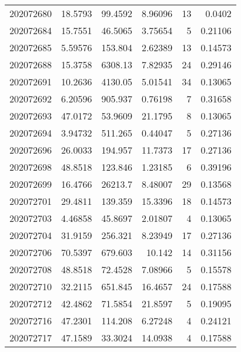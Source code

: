 \begin{tabular}{rrrrrr}
 202072680 &         18.5793  &       99.4592 &            8.96096 &          13 & 0.0402  \\
 202072684 &         15.7551  &       46.5065 &            3.75654 &           5 & 0.21106 \\
 202072685 &          5.59576 &      153.804  &            2.62389 &          13 & 0.14573 \\
 202072688 &         15.3758  &     6308.13   &            7.82935 &          24 & 0.29146 \\
 202072691 &         10.2636  &     4130.05   &            5.01541 &          34 & 0.13065 \\
 202072692 &          6.20596 &      905.937  &            0.76198 &           7 & 0.31658 \\
 202072693 &         47.0172  &       53.9609 &           21.1795  &           8 & 0.13065 \\
 202072694 &          3.94732 &      511.265  &            0.44047 &           5 & 0.27136 \\
 202072696 &         26.0033  &      194.957  &           11.7373  &          17 & 0.27136 \\
 202072698 &         48.8518  &      123.846  &            1.23185 &           6 & 0.39196 \\
 202072699 &         16.4766  &    26213.7    &            8.48007 &          29 & 0.13568 \\
 202072701 &         29.4811  &      139.359  &           15.3396  &          18 & 0.14573 \\
 202072703 &          4.46858 &       45.8697 &            2.01807 &           4 & 0.13065 \\
 202072704 &         31.9159  &      256.321  &            8.23949 &          17 & 0.27136 \\
 202072706 &         70.5397  &      679.603  &           10.142   &          14 & 0.31156 \\
 202072708 &         48.8518  &       72.4528 &            7.08966 &           5 & 0.15578 \\
 202072710 &         32.2115  &      651.845  &           16.4657  &          24 & 0.17588 \\
 202072712 &         42.4862  &       71.5854 &           21.8597  &           5 & 0.19095 \\
 202072716 &         47.2301  &      114.208  &            6.27248 &           4 & 0.24121 \\
 202072717 &         47.1589  &       33.3024 &           14.0938  &           4 & 0.17588 \\

\end{tabular}
